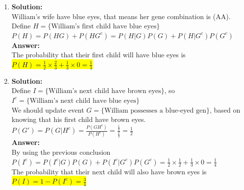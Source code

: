 \documentclass{article}
\newcommand{\myansw}{\textbf{Answer:}\\}
\newcommand{\mysolu}{\textbf{Solution:}\\}
\begin{document}
\begin{enumerate}
\begin{enumerate}
		\mysolu
		Assume A is the blue-eyed genes and B is the brown-eyed gene. Since William's sister have blue eye and William and both of his parents have brown eyes, we can know that both of William's parents are (AB) combination.
		The possible gene combinations of William is (AA), (AB), (BA), (BB). Define ${E = \{\text{William possesses a blue-eyed gene}\}}$, ${F = \{\text{William has brown eyes}\}}$.\\
		${P(F) = \frac{3}{4}}$\\
		${P(E)= \frac{2}{4} = \frac{1}{2}}$\\
		\myansw
		The probability that William possesses a blue-eyed gene is\\
		\colorbox{yellow}{${P(G)=P(E|F)=\frac{P(EF)}{P(F)}=\frac{0.5}{0.75}=\frac{2}{3}}$}\\
		\item
		\mysolu
		William's wife have blue eyes, that means her gene combination is (AA).\\
		Define ${H = \{\text{William's first child have blue eyes}\}}$\\
		${P(H) = P(HG)+P(HG^c)={P(H|G)}{P(G)}+{P(H|G^c)}{P(G^c)}}$\\
		\myansw
		The probability that their first child will have blue eyes is\\
		\colorbox{yellow}{${P(H) = \frac{1}{2} \times \frac{2}{3}+\frac{1}{3} \times 0 = \frac{1}{3}}$}\\
		\item
		\mysolu
		Define ${I = \{\text{William's next child have brown eyes}\}}$, so ${I^c = \{\text{William's next child have blue eyes}\}}$\\
		We should update event ${G = \{\text{William possesses a blue-eyed gen}\}}$, based on knowing that his first child have brown eyes.\\
		${P(G')=P(G|H^c)=\frac{P(GH^c)}{P(H^c)}=\frac{\frac{1}{3}}{\frac{2}{3}}=\frac{1}{2}}$\\
		\myansw
		By using the previous conclusion\\
		${P(I^c)= P(I^c|G)P(G)+P(I^c|G^c)P(G^c)=\frac{1}{2}\times \frac{1}{2}+\frac{1}{3} \times 0 = \frac{1}{4}}$\\
		The probability that their next child will also have brown eyes is\\
		\colorbox{yellow}{${P(I)=1-P(I^c) = \frac{3}{4}}$} \\
		

\end{enumerate}
\end{enumerate}
\end{document}
